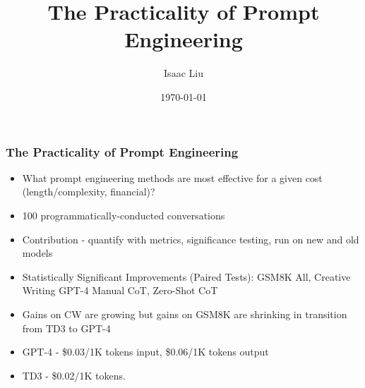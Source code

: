 \documentclass{beamer}
\title[The Practicality of Prompt Engineering]{The Practicality of Prompt Engineering}
\author{Isaac Liu}
\date{\today}
\begin{document}
    \begin{frame}
        \frametitle{The Practicality of Prompt Engineering}
        \begin{itemize}
            \item What prompt engineering methods are most effective for a given cost (length/complexity, financial)?
            \item 100 programmatically-conducted conversations
            \item Contribution - quantify with metrics, significance testing, run on new and old models
            \item Statistically Significant Improvements (Paired Tests): GSM8K All, Creative Writing GPT-4 Manual CoT, Zero-Shot CoT
            \item Gains on CW are growing but gains on GSM8K are shrinking in transition from TD3 to GPT-4 %
            \item GPT-4 - \$0.03/1K tokens input, \$0.06/1K tokens output
            \item TD3 - \$0.02/1K tokens.
        \end{itemize}


        \begin{figure}[h]


\end{figure}
\end{frame}
\end{document}
